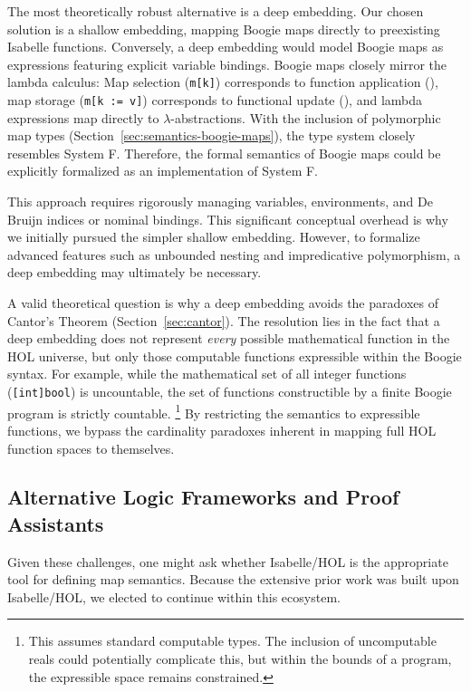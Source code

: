The most theoretically robust alternative is a deep embedding.
Our chosen solution is a shallow embedding, mapping Boogie maps directly to preexisting Isabelle functions.
Conversely, a deep embedding would model Boogie maps as expressions featuring explicit variable bindings.
Boogie maps closely mirror the lambda calculus:
Map selection (\lstinline[columns=fixed]{m[k]}) corresponds to function application (),
map storage (\lstinline[columns=fixed]{m[k := v]}) corresponds to functional update (),
and lambda expressions map directly to $\lambda$-abstractions.
With the inclusion of polymorphic map types (Section~\ref{sec:semantics-boogie-maps}), the type system closely resembles System F. %
Therefore, the formal semantics of Boogie maps could be explicitly formalized as an implementation of System F.

This approach requires rigorously managing variables, environments, and De Bruijn indices or nominal bindings.
This significant conceptual overhead is why we initially pursued the simpler shallow embedding.
However, to formalize advanced features such as unbounded nesting and impredicative polymorphism, a deep embedding may ultimately be necessary.

A valid theoretical question is why a deep embedding avoids the paradoxes of Cantor's Theorem (Section~\ref{sec:cantor}).
The resolution lies in the fact that a deep embedding does not represent \emph{every} possible mathematical function in the HOL universe,
but only those computable functions expressible within the Boogie syntax.
For example, while the mathematical set of all integer functions (\lstinline[columns=fixed]{[int]bool}) is uncountable,
the set of functions constructible by a finite Boogie program is strictly countable.
\footnote{This assumes standard computable types. The inclusion of uncomputable reals could potentially complicate this, but within the bounds of a program, the expressible space remains constrained.}
By restricting the semantics to expressible functions, we bypass the cardinality paradoxes inherent in mapping full HOL function spaces to themselves.

\subsection{Alternative Logic Frameworks and Proof Assistants}

Given these challenges, one might ask whether Isabelle/HOL is the appropriate tool for defining map semantics.
Because the extensive prior work was built upon Isabelle/HOL, we elected to continue within this ecosystem.

